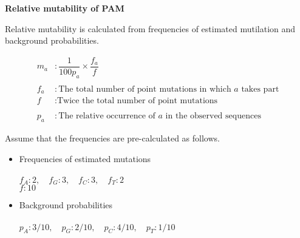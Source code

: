 \question \textbf{Relative mutability of PAM}

Relative mutability is calculated from frequencies of estimated mutilation and background probabilities.

\begin{align*}
m_a &:  \dfrac{1}{100p_a}  \times \dfrac{f_a}{f} \\ \\
f_a &:  \text{The total number of point mutations in which } a \text{ takes part}  \\
f &:  \text{Twice the total number of point mutations} \\ \\
p_a &: \text{The relative occurrence of } a \text{ in the observed sequences}
\end{align*}

\noindent
Assume that the frequencies are pre-calculated as follows.
\begin{itemize}
\item Frequencies of estimated mutations \\ \\
 $f_A: 2, \quad f_G: 3, \quad f_C: 3, \quad f_T: 2$ \\
 $f: 10$ \\

\item Background probabilities \\ \\
 $p_A: 3/10, \quad p_G: 2/10, \quad p_C: 4/10, \quad p_T: 1/10 $
 
\end{itemize}

